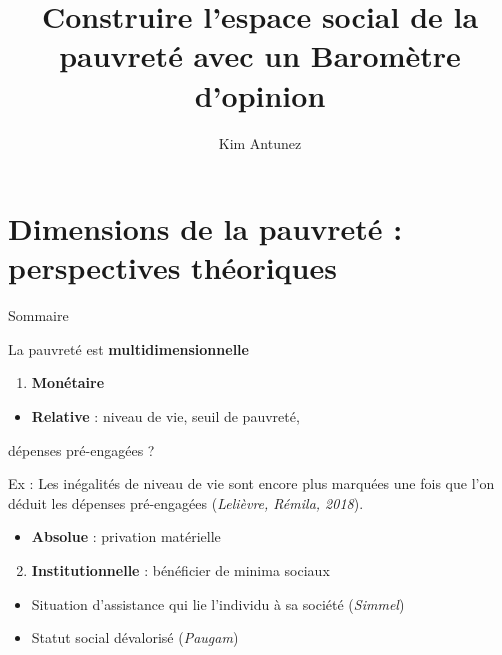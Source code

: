 \documentclass[10pt,xcolor=table,color={dvipsnames,usenames},ignorenonframetext,usepdftitle=false,french]{beamer}
\title{Construire l'espace social de la pauvreté avec un Baromètre
d'opinion}
\author{Kim Antunez\\}
\date{}
\providecommand{\tightlist}{%
  \setlength{\parskip}{0pt}
  }
\begin{document}
\begin{frame}
\titlepage
\end{frame}

\hypertarget{chap1}{%
\section{Dimensions de la pauvreté : perspectives
théoriques}\label{chap1}}

\begin{frame}{Sommaire}
\protect\hypertarget{sommaire}{}
\end{frame}

\begin{frame}{La pauvreté est \textbf{multidimensionnelle}}
\protect\hypertarget{la-pauvretuxe9-est-multidimensionnelle}{}
\begin{enumerate}
\tightlist
\item
  \textbf{Monétaire}
\end{enumerate}

\begin{itemize}
\tightlist
\item
  \textbf{Relative} : niveau de vie, seuil de pauvreté,
\end{itemize}

dépenses pré-engagées ?

Ex : Les inégalités de niveau de vie sont encore plus marquées une fois
que l'on déduit les dépenses pré-engagées (\emph{Lelièvre, Rémila,
2018}). \pause

\begin{itemize}
\tightlist
\item
  \textbf{Absolue} : privation matérielle
\end{itemize}

\pause

\bigskip

\bigskip

\begin{enumerate}
\setcounter{enumi}{1}
\tightlist
\item
  \textbf{Institutionnelle} : bénéficier de minima sociaux
\end{enumerate}

\begin{itemize}
\item
  Situation d'assistance qui lie l'individu à sa société (\emph{Simmel})
\item
  Statut social dévalorisé (\emph{Paugam})
\end{itemize}
\end{frame}
\end{document}
